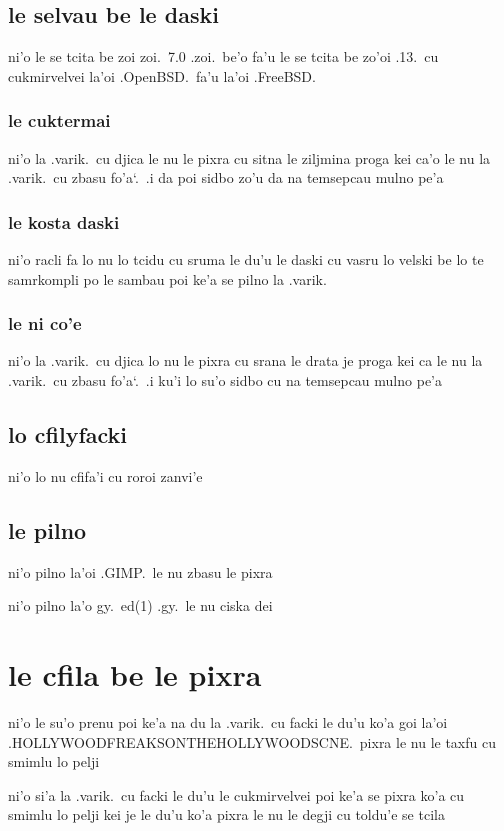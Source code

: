 \documentclass{report}
\newcommand\sds{\spacefactor\sfcode`.\ \space}
\begin{document}
\subsection{le selvau be le daski}
ni'o le se tcita be zoi zoi.\ 7.0 .zoi.\ be'o fa'u le se tcita be zo'oi .13.\ cu cukmirvelvei la'oi .OpenBSD.\ fa'u la'oi .FreeBSD.

\subsubsection{le cuktermai}
ni'o la .varik.\ cu djica le nu le pixra cu sitna le ziljmina proga kei ca'o le nu la .varik.\ cu zbasu fo'a\sds  .i da poi sidbo zo'u da na temsepcau mulno pe'a

\subsubsection{le kosta daski}
ni'o racli fa lo nu lo tcidu cu sruma le du'u le daski cu vasru lo velski be lo te samrkompli po le sambau poi ke'a se pilno la .varik.

\subsubsection{le ni co'e}
ni'o la .varik.\ cu djica lo nu le pixra cu srana le drata je proga kei ca le nu la .varik.\ cu zbasu fo'a\sds  .i ku'i lo su'o sidbo cu na temsepcau mulno pe'a

\subsection{lo cfilyfacki}
ni'o lo nu cfifa'i cu roroi zanvi'e

\subsection{le pilno}
ni'o pilno la'oi .GIMP.\ le nu zbasu le pixra

ni'o pilno la'o gy.\ ed(1) .gy.\ le nu ciska dei

\section{le cfila be le pixra}
ni'o le su'o prenu poi ke'a na du la .varik.\ cu facki le du'u ko'a goi la'oi .HOLLYWOODFREAKSONTHEHOLLYWOODSCNE.\ pixra le nu le taxfu cu smimlu lo pelji

ni'o si'a la .varik.\ cu facki le du'u le cukmirvelvei poi ke'a se pixra ko'a cu smimlu lo pelji kei je le du'u ko'a pixra le nu le degji cu toldu'e se tcila
\end{document}
